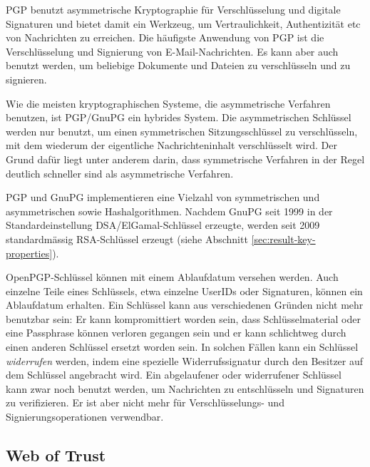 PGP benutzt asymmetrische Kryptographie f\"ur Verschl\"usselung und
digitale Signaturen und bietet damit ein Werkzeug, um Vertraulichkeit,
Authentizit\"at etc von Nachrichten zu erreichen. Die h\"aufigste
Anwendung von PGP ist die Verschl\"usselung und Signierung von
E-Mail-Nachrichten. Es kann aber auch benutzt werden, um beliebige
Dokumente und Dateien zu verschl\"usseln und zu signieren.

Wie die meisten kryptographischen Systeme, die asymmetrische Verfahren
benutzen, ist PGP/GnuPG ein hybrides System. Die asymmetrischen
Schl\"ussel werden nur benutzt, um einen symmetrischen
Sitzungsschl\"ussel zu verschl\"usseln, mit dem wiederum der
eigentliche Nachrichteninhalt verschl\"usselt wird. Der Grund daf\"ur
liegt unter anderem darin, dass symmetrische Verfahren in der Regel
deutlich schneller sind als asymmetrische Verfahren.

PGP und GnuPG implementieren eine Vielzahl von symmetrischen und
asymmetrischen sowie Hashalgorithmen. Nachdem GnuPG seit 1999 in der
Standardeinstellung DSA/ElGamal-Schl\"ussel erzeugte, werden seit 2009
standardm\"assig RSA-Schl\"ussel erzeugt (siehe Abschnitt
\ref{sec:result-key-properties}).

OpenPGP-Schl\"ussel k\"onnen mit einem Ablaufdatum versehen
werden. Auch einzelne Teile eines Schl\"ussels, etwa einzelne UserIDs
oder Signaturen, k\"onnen ein Ablaufdatum erhalten. Ein Schl\"ussel
kann aus verschiedenen Gr\"unden nicht mehr benutzbar sein: Er kann
kompromittiert worden sein, dass Schl\"usselmaterial oder eine
Passphrase k\"onnen verloren gegangen sein und er kann schlichtweg
durch einen anderen Schl\"ussel ersetzt worden sein. In solchen
F\"allen kann ein Schl\"ussel \emph{widerrufen} werden, indem eine
spezielle Widerrufssignatur durch den Besitzer auf dem Schl\"ussel
angebracht wird. Ein abgelaufener oder widerrufener Schl\"ussel kann
zwar noch benutzt werden, um Nachrichten zu entschl\"usseln und
Signaturen zu verifizieren. Er ist aber nicht mehr f\"ur
Verschl\"usselungs- und Signierungsoperationen verwendbar.

\subsection{Web of Trust}
\label{ch:Grundlagen:sec:PublicKeyCrypto:subsec:KeyAuth:subsubsec:WOT}

